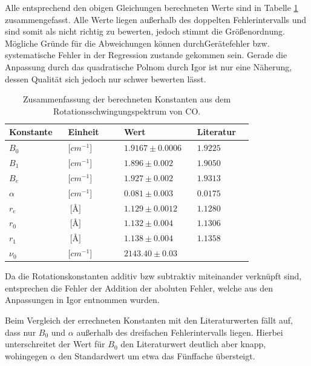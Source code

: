 Alle entsprechend den obigen Gleichungen berechneten Werte sind in Tabelle \ref{Zusammenfassung} zusammengefasst. Alle Werte liegen außerhalb des doppelten Fehlerintervalls und sind somit als nicht richtig zu bewerten, jedoch stimmt die Größenordnung. Mögliche Gründe für die Abweichungen können durchGerätefehler bzw. systematische Fehler in der Regression zustande gekommen sein. Gerade die Anpassung durch das quadratische Polnom durch Igor ist nur eine Näherung, dessen Qualität sich jedoch nur schwer bewerten lässt.

\begin{table}
\label{Zusammenfassung}
	\caption{Zusammenfassung der berechneten Konstanten aus dem Rotationsschwingungspektrum von CO.  }
\begin{tabular}{C{0.2\linewidth}|C{0.2\linewidth}|C{0.2\linewidth}|C{0.2\linewidth}}
Konstante             & Einheit                  & Wert                           & Literatur \\ \hline
$B_0$                  & [$cm^{-1}$]          & $1.9167 \pm 0.0006$	& $1.9225$   \\
$B_1$                  & [$cm^{-1}$]          & $1.896 \pm 0.002$   	& $1.9050$   \\
$B_e $                 & [$cm^{-1}$]          & $1.927 \pm 0.002$   	& $1.9313$   \\
$\alpha$		& [$cm^{-1}$]       & $0.081 \pm 0.003$   	& $0.0175$   \\
$r_e$                  & $\SI{}{[\angstrom]}$		& $1.129 \pm 0.0012 $  	& $1.1280$     \\
$r_0$                  & $\SI{}{[\angstrom]} $		& $1.132 \pm 0.004$  	 & $1.1306$     \\
$r_1$                  & $\SI{}{[\angstrom]}$ 		& $1.138 \pm 0.004$  	 & $1.1358$    \\
$\nu_0$	&[$cm^{-1}$]          & $2143.40 \pm 0.03$&
\end{tabular}
\end{table}


Da die Rotationskonstanten additiv bzw subtraktiv miteinander verknüpft sind, entsprechen die Fehler der Addition der aboluten Fehler, welche aus den Anpassungen in Igor entnommen wurden. 

Beim Vergleich der errechneten Konstanten mit den Literaturwerten fällt auf, dass nur $B_0$ und $\alpha$ außerhalb des dreifachen Fehlerintervalls liegen. Hierbei unterschreitet der Wert für $B_0$ den Literaturwert deutlich aber knapp, wohingegen $\alpha$ den Standardwert um etwa das Fünffache übersteigt. 



%

